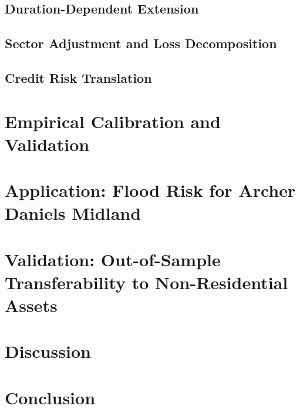 \documentclass[preprint,12pt,authoryear]{elsarticle}
\begin{document}
\subsection{Duration-Dependent Extension} \label{ssec: duration}


\subsection{Sector Adjustment and Loss Decomposition} \label{ssec: sector}


\subsection{Credit Risk Translation} \label{ssec: pd shift}


\section{Empirical Calibration and Validation}
\label{sec: empirical}


\section{Application: Flood Risk for Archer Daniels Midland} \label{sec: adm}


\section{Validation: Out-of-Sample Transferability to Non-Residential Assets} \label{sec: event study}


\section{Discussion} \label{sec: discussion}


\section{Conclusion} \label{sec: conclusion}


\end{document}
